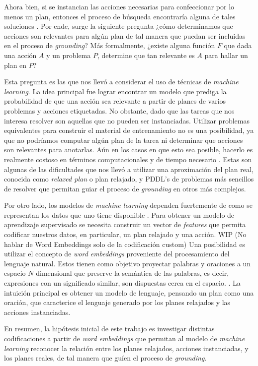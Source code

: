 Ahora bien, si se instancian las acciones necesarias para confeccionar por lo menos un plan, entonces el proceso de búsqueda encontraría alguna de tales soluciones \citep{TODO}. Por ende, surge la siguiente pregunta ¿cómo determinamos que acciones son relevantes para algún plan de tal manera que puedan ser incluidas en el proceso de \emph{grounding}? Más formalmente, ¿existe alguna función $F$ que dada una acción $A$ y un problema $P$, determine que tan relevante es $A$ para hallar un plan en $P$?

Esta pregunta es las que nos llevó a considerar el uso de técnicas de \emph{machine learning}. La idea principal fue lograr encontrar un modelo que prediga la probabilidad de que una acción sea relevante a partir de planes de varios problemas y acciones etiquetadas. No obstante, dado que las tareas que nos interesa resolver son aquellas que no pueden ser instanciadas. Utilizar problemas equivalentes para construir el material de entrenamiento no es una posibilidad, ya que no podríamos computar algún plan de la tarea ni determinar que acciones son relevantes para anotarlas. Aún en los casos en que esto sea posible, hacerlo es realmente costoso en términos computacionales y de tiempo necesario \citep{?}. Estas son algunas de las dificultades que nos llevó a utilizar una aproximación del plan real, conocida como \emph{relaxed plan} o plan relajado, y PDDL's de problemas más sencillos de resolver que permitan guiar el proceso de \emph{grounding} en otros más complejos.

Por otro lado, los modelos de \emph{machine learning} dependen fuertemente de como se representan los datos que uno tiene disponible \citep{Heaton-2016-AnEA}. Para obtener un modelo de aprendizaje supervisado se necesita construir un vector de \emph{features} que permita codificar nuestros datos, en particular, un plan relajado y una acción. WIP (No hablar de Word Embeddings solo de la codificación custom) Una posibilidad es utilizar el concepto de \emph{word embeddings} proveniente del procesamiento del lenguaje natural. Estos tienen como objetivo proyectar palabras y oraciones a un espacio $N$ dimensional que preserve la semántica de las palabras, es decir, expresiones con un significado similar, son dispuestas cerca en el espacio. \citep{Mikolov-Ilya-Kai-Greg-Jeffrey-2013, Pennington-Jeffrey-Socher-Richard-Manning-Christopher-2014, Bojanowski-Grave-Joulin-Mikolov-2016}.
La intuición principal es obtener un modelo de lenguaje, pensando un plan como una oración, que caracterice el lenguaje generado por los planes relajados y las acciones instanciadas.

En resumen, la hipótesis inicial de este trabajo es investigar distintas codificaciones a partir de \emph{word embeddings} que permitan al modelo de \emph{machine learning} reconocer la relación entre los planes relajados, acciones instanciadas, y los planes reales, de tal manera que guíen el proceso de \emph{grounding}.
